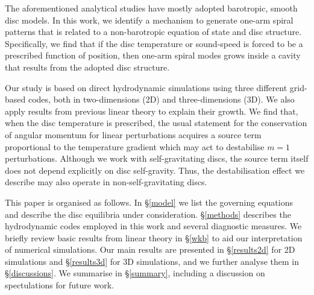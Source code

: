 \documentclass[useAMS,usenatbib]{mn2e}
\begin{document}
The aforementioned analytical studies have mostly adopted barotropic, smooth disc models. 
In this work, we identify a mechanism to generate one-arm
spiral patterns that is related to a non-barotropic equation of
state and disc structure. Specifically, we find that if the disc temperature or
sound-speed is forced to be a prescribed function of position, then 
one-arm spiral modes grows inside a cavity that results from the
adopted disc structure. 

Our study is based on direct hydrodynamic simulations using three
different grid-based codes, both in two-dimensions (2D) and
three-dimensions (3D). We also apply results from previous linear
theory to explain their growth. We find that, when the disc
temperature is prescribed, the usual statement for the conservation of
angular momentum for linear perturbations acquires a source term
proportional to the temperature gradient which may act to destabilise
$m=1$ perturbations. Although we work with self-gravitating discs, the
source term itself does not depend explicitly on disc self-gravity. Thus, the
destabilisation effect we describe may also operate in
non-self-gravitating discs. 

This paper is organised as follows. In \S\ref{model} we list the
governing equations and describe the disc equilibria under
consideration. \S\ref{methods} describes the hydrodynamic codes
employed in this work and several diagnostic measures. We briefly
review basic results from linear theory in \S\ref{wkb} to aid our
interpretation of numerical simulations.  Our main results are presented in 
\S\ref{results2d} for 2D simulations and \S\ref{results3d} for 3D
simulations, and we further analyse them in \S\ref{discussions}. 
We summarise in \S\ref{summary}, including a discussion on
spectulations for future work. 











\appendix

\end{document}
